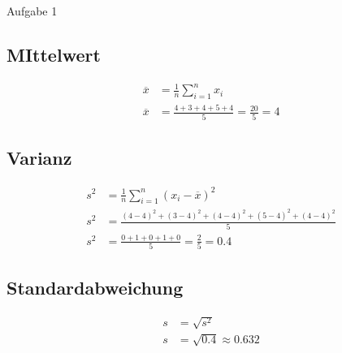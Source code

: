 \documentclass[11pt,a4paper,oneside]{article}
\begin{document}
	
	\newpage
	
	\begin{loesung}{Aufgabe 1}
		\subsection*{MIttelwert}
		\vspace{-10mm}
		\begin{align*}
			\overline{x} &= \frac{1}{n} \sum^{n}_{i = 1} x_i \\
			\overline{x} &= \frac{4 + 3 + 4 + 5 + 4 }{5} = \boxed{\frac{20}{5} = 4}
		\end{align*}
		\subsection*{Varianz}
		\vspace{-10mm}
		\begin{align*}
			s^2 &= \frac{1}{n} \sum_{i = 1}^{n} (x_i - \overline{x})^2 \\
			s^2 &= \frac{(4 - 4)^2 + (3 - 4)^2 + (4 - 4)^2 + (5 - 4)^2 + (4 - 4)^2}{5} \\
			s^2 &= \frac{0 + 1 + 0 + 1 + 0}{5} = \boxed{\frac{2}{5}  =0.4}
		\end{align*}
		\subsection*{Standardabweichung}
		\vspace{-10mm}
		\begin{align*}
			s &= \sqrt{s^2}\\
			s &= \sqrt{0.4} \approx \boxed{0.632} 
		\end{align*}
	\end{loesung}
	
\end{document}
